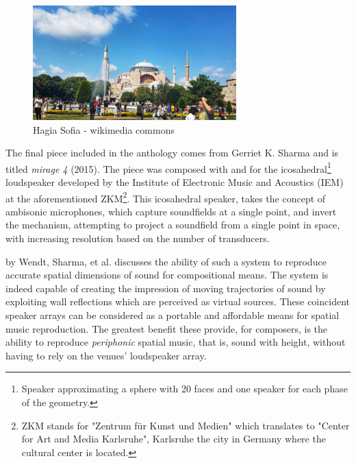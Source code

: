 
\begin{figure}[ht!]%
\centering
\includegraphics[width=0.7\textwidth]{img/hagia-sofia.jpg} 
\caption{Hagia Sofia - wikimedia commons}
\end{figure}

The final piece included in the anthology \cite{hagan2017sound} comes from Gerriet K. Sharma and is titled \textit{mirage 4} (2015). The piece was composed with and for the icosahedral\footnote{Speaker approximating a sphere with 20 faces and one speaker for each phase of the geometry.} loudspeaker developed by the Institute of Electronic Music and Acoustics (IEM) at the aforementioned ZKM\footnote{ZKM stands for "Zentrum für Kunst und Medien" which translates to "Center for Art and Media Karlsruhe", Karlsruhe the city in Germany where the cultural center is located.}. This icosahedral speaker, takes the concept of ambisonic microphones, which capture soundfields at a single point, and invert the mechanism, attempting to project a soundfield from a single point in space, with increasing resolution based on the number of transducers. 

\cite{wendt2017perception} by Wendt, Sharma, et al. discusses the ability of such a system to reproduce accurate spatial dimensions of sound for compositional means. The system is indeed capable of creating the impression of moving trajectories of sound by exploiting wall reflections which are perceived as virtual sources. These coincident speaker arrays can be considered as a portable and affordable means for spatial music reproduction. The greatest benefit these provide, for composers, is the ability to reproduce \textit{periphonic} spatial music, that is, sound with height, without having to rely on the venues' loudspeaker array. 

